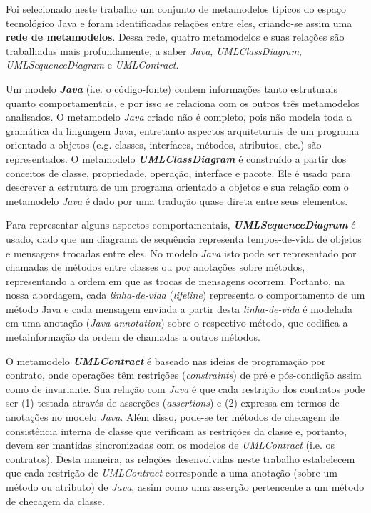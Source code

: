 \documentclass[cic,resumo-unibral]{iiufrgs}
\begin{document}
\begin{extendedsummary}
Foi selecionado neste trabalho um conjunto de metamodelos típicos do espaço tecnológico Java e foram identificadas relações entre eles, criando-se assim uma \textbf{rede de metamodelos}. Dessa rede, quatro metamodelos e suas relações são trabalhadas mais profundamente, a saber \textit{Java}, \textit{UMLClassDiagram}, \textit{UMLSequenceDiagram} e \textit{UMLContract}.

Um modelo \textbf{\textit{Java}} (i.e. o código-fonte) contem informações tanto estruturais quanto comportamentais, e por isso se relaciona com os outros três metamodelos analisados. O metamodelo \textit{Java} criado não é completo, pois não modela toda a gramática da linguagem Java, entretanto aspectos arquiteturais de um programa orientado a objetos (e.g. classes, interfaces, métodos, atributos, etc.) são representados. O metamodelo \textbf{\textit{UMLClassDiagram}} é construído a partir dos conceitos de classe, propriedade, operação, interface e pacote. Ele é usado para descrever a estrutura de um programa orientado a objetos e sua relação com o metamodelo \textit{Java} é dado por uma tradução quase direta entre seus elementos.

Para representar alguns aspectos comportamentais,\textbf{ \textit{UMLSequenceDiagram}} é usado, dado que um diagrama de sequência representa tempos-de-vida de objetos e mensagens trocadas entre eles. No modelo \textit{Java} isto pode ser representado por chamadas de métodos entre classes ou por anotações sobre métodos, representando a ordem em que as trocas de mensagens ocorrem. Portanto, na nossa abordagem, cada \textit{linha-de-vida} (\textit{lifeline}) representa o comportamento de um método Java e cada mensagem enviada a partir desta \textit{linha-de-vida} é modelada em uma anotação (\textit{Java annotation}) sobre o respectivo método, que codifica a metainformação da ordem de chamadas a outros métodos.

O metamodelo \textbf{\textit{UMLContract}} é baseado nas ideias de programação por contrato, onde operações têm restrições (\textit{constraints}) de pré e pós-condição assim como de invariante. Sua relação com \textit{Java} é que cada restrição dos contratos pode ser (1) testada através de asserções (\textit{assertions}) e (2) expressa em termos de anotações no modelo \textit{Java}. Além disso, pode-se ter métodos de checagem de consistência interna de classe que verificam as restrições da classe e, portanto, devem ser mantidas sincronizadas com os modelos de \textit{UMLContract} (i.e. os contratos). Desta maneira, as relações desenvolvidas neste trabalho estabelecem que cada restrição de \textit{UMLContract} corresponde a uma anotação (sobre um método ou atributo) de \textit{Java}, assim como uma asserção pertencente a um método de checagem da classe.


\end{extendedsummary}
\end{document}
